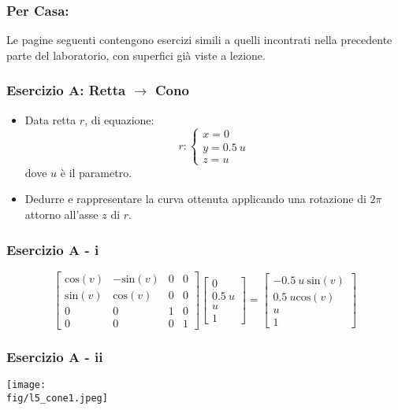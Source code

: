 \documentclass{beamer}
\newcommand{\fig}{./figures} %
\newcommand{\msin}{\mbox{sin}} %
\newcommand{\mcos}{\mbox{cos}} %
\begin{document}
\begin{frame}
\frametitle{Per Casa:}
Le pagine seguenti contengono esercizi simili a quelli incontrati nella
precedente parte del laboratorio, con superfici gi\`a viste a lezione. 

\end{frame}
\begin{frame}
\frametitle{Esercizio A: Retta $\rightarrow$ Cono}
\begin{itemize}
\item Data  retta $r$, di equazione:
\begin{displaymath}
r:
\begin{cases}
x = 0 \\
y = 0.5~u\\
z = u
\end{cases}
\end{displaymath}
dove $u$ \`e il parametro.
\item Dedurre e rappresentare la curva ottenuta applicando una rotazione di $2\pi$ attorno all'asse $z$ di $r$.
\end{itemize}
\end{frame}
\begin{frame}
\frametitle{Esercizio A - i}
\begin{displaymath}
\begin{bmatrix}
\mcos(v) &  -\msin(v) & 0 & 0\\
\msin(v) &   \mcos(v) & 0 & 0\\
0 & 0 & 1 & 0\\
0 & 0 & 0 & 1
\end{bmatrix}
\begin{bmatrix}
0 \\ 0.5~u \\ u\\ 1
\end{bmatrix}
= 
\begin{bmatrix}
-0.5~u~\msin(v) \\ 0.5~u\mcos(v) \\ u \\ 1
\end{bmatrix}
\end{displaymath}
\end{frame}
\begin{frame}
\frametitle{Esercizio A - ii}
\begin{center}
\texttt{[image: \\fig/l5\_cone1.jpeg]}
\end{center}
\end{frame}
%
\end{document}
